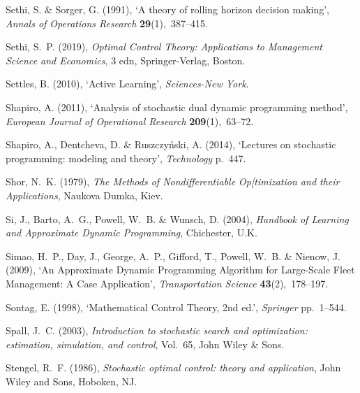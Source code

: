 \documentclass[11pt,oneside,fleqn,reqno,titlepage]{article}
\begin{document}
\begin{thebibliography}{xx}
Sethi, S. \& Sorger, G.  (1991), `A theory of rolling horizon decision making',
  {\em Annals of Operations Research} {\bf 29}(1),~387--415.

Sethi, S.~P.  (2019), {\em {Optimal Control Theory: Applications to Management
  Science and Economics}}, 3 edn, Springer-Verlag, Boston.

Settles, B.  (2010), `{Active Learning}', {\em Sciences-New York}.

Shapiro, A.  (2011), `{Analysis of stochastic dual dynamic programming
  method}', {\em European Journal of Operational Research} {\bf
  209}(1),~63--72.

Shapiro, A., Dentcheva, D. \& Ruszczy{\'{n}}ski, A.  (2014), `{Lectures on
  stochastic programming: modeling and theory}', {\em Technology} p.~447.

Shor, N.~K.  (1979), {\em {The Methods of Nondifferentiable Op[timization and
  their Applications}}, Naukova Dumka, Kiev.

Si, J., Barto, A.~G., Powell, W.~B. \& Wunsch, D.  (2004), {\em {Handbook of
  Learning and Approximate Dynamic Programming}}, Chichester, U.K.

Simao, H.~P., Day, J., George, A.~P., Gifford, T., Powell, W.~B. \& Nienow, J.
  (2009), `{An Approximate Dynamic Programming Algorithm for Large-Scale Fleet
  Management: A Case Application}', {\em Transportation Science} {\bf
  43}(2),~178--197.

Sontag, E.  (1998), `{Mathematical Control Theory, 2nd ed.}', {\em Springer}
  pp.~1--544.

Spall, J.~C.  (2003), {\em Introduction to stochastic search and optimization:
  estimation, simulation, and control}, Vol.~65, John Wiley \& Sons.

Stengel, R.~F.  (1986), {\em {Stochastic optimal control: theory and
  application}}, John Wiley and Sons, Hoboken, NJ.


\end{thebibliography}
\end{document}
